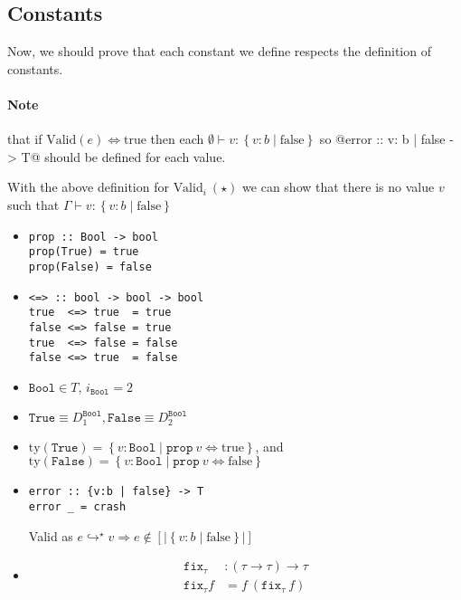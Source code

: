 \documentclass[10pt,a4paper]{article}
\newcommand\showproof[1]{\texttt{proved}}
\newcommand\efix[1]{\ensuremath{\mathtt{fix}_{#1}\xspace}}
\newcommand\eapp[2]{\ensuremath{#1 \ #2}}
\newcommand\etrue{\ensuremath{\text{true}}}
\newcommand\efalse{\ensuremath{\text{false}}}
\newcommand\tref[3]{\ensuremath{\left\lbrace {#1} \colon {#2} \mid {#3} \right\rbrace}}
\newcommand\validi[1]{\ensuremath{\text{Valid}_{i}\ (#1)}}
\newcommand\valid[1]{\ensuremath{\text{Valid}(#1)}}
\newcommand\ty[1]{\ensuremath{\text{ty}({#1})}}
\newcommand\interp[1]{\ensuremath{[|#1|]}}
\newcommand\evals[2]{\ensuremath{#1 \hookrightarrow^\star #2}}
\newcommand\hastype[3]{\ensuremath{#1 \vdash #2 : #3}}
\begin{document}
\subsection{Constants}

Now, we should prove that each constant we define respects 
the definition of constants.

\paragraph{Note} that 
if $\valid{e} \Leftrightarrow \etrue$
then each $\hastype{\emptyset}{v}{\tref{v}{b}{\efalse}}$
so @error :: {v: b | false } -> T@ should be defined for each value.

With the above definition for \validi{\star} we can show 
that there is no value $v$ such that \hastype{\Gamma}{v}{\tref{v}{b}{\efalse}}

\newcommand\prop{\ensuremath{\mathtt{prop}}}
\begin{itemize}
\item 
\begin{verbatim}
prop :: Bool -> bool
prop(True) = true
prop(False) = false
\end{verbatim}

\item 
\begin{verbatim}
<=> :: bool -> bool -> bool
true  <=> true  = true
false <=> false = true
true  <=> false = false
false <=> true  = false
\end{verbatim}

\item $\texttt{Bool}\in T$, $i_\texttt{Bool} = 2$
\item $\texttt{True}  \equiv D^{\texttt{Bool}}_1, \texttt{False} \equiv D^{\texttt{Bool}}_2$
\item $\ty{\texttt{True}} = \tref{v}{\texttt{Bool}}{\prop\ v \Leftrightarrow \etrue}$, and
$\ty{\texttt{False}} = \tref{v}{\texttt{Bool}}{\prop\ v \Leftrightarrow \efalse}$

\item 
\begin{verbatim}
error :: {v:b | false} -> T
error _ = crash
\end{verbatim}

Valid as $\evals{e}{v} \Rightarrow e \notin \interp{\tref{v}{b}{\efalse}}$

\item 
\begin{align*}
\efix{\tau} & : (\tau\rightarrow\tau) \rightarrow \tau\\
\efix{\tau} f &=\eapp{f}{(\eapp{\efix{\tau}}{f})}
\end{align*}
{%

}
\end{itemize}
\end{document}
